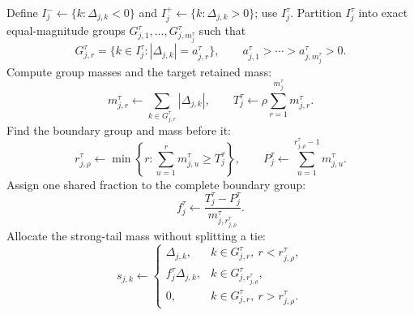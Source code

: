 \begin{algorithm}[H]
\begin{algorithmic}[1]
                    \State Define
                    $I_j^-\leftarrow\{k:\Delta_{j,k}<0\}$ and
                    $I_j^+\leftarrow\{k:\Delta_{j,k}>0\}$; use $I_j^\tau$.
                        \State Partition $I_j^\tau$ into exact equal-magnitude groups
                        $G_{j,1}^\tau,\dots,G_{j,m_j^\tau}^\tau$ such that
                        \[
                            G_{j,r}^\tau
                            =\{k\in I_j^\tau:|\Delta_{j,k}|=a_{j,r}^\tau\},
                            \qquad
                            a_{j,1}^\tau>\cdots>a_{j,m_j^\tau}^\tau>0.
                        \]
                        \State Compute group masses and the target retained mass:
                        \[
                            m_{j,r}^\tau\leftarrow
                            \sum_{k\in G_{j,r}^\tau}|\Delta_{j,k}|,
                            \qquad
                            T_j^\tau\leftarrow
                            \rho\sum_{r=1}^{m_j^\tau}m_{j,r}^\tau.
                        \]
                        \State Find the boundary group and mass before it:
                        \[
                            r_{j,\rho}^\tau\leftarrow
                            \min\left\{r:
                            \sum_{u=1}^{r}m_{j,u}^\tau\ge T_j^\tau\right\},
                            \qquad
                            P_j^\tau\leftarrow
                            \sum_{u=1}^{r_{j,\rho}^\tau-1}m_{j,u}^\tau.
                        \]
                        \State Assign one shared fraction to the complete boundary group:
                        \[
                            f_j^\tau\leftarrow
                            \frac{T_j^\tau-P_j^\tau}
                            {m_{j,r_{j,\rho}^\tau}^\tau}.
                        \]
                        \State Allocate the strong-tail mass without splitting a tie:
                        \[
                            s_{j,k}\leftarrow
                            \begin{cases}
                                \Delta_{j,k},
                                &k\in G_{j,r}^\tau,\ r<r_{j,\rho}^\tau,\\
                                f_j^\tau\Delta_{j,k},
                                &k\in G_{j,r_{j,\rho}^\tau}^\tau,\\
                                0,
                                &k\in G_{j,r}^\tau,\ r>r_{j,\rho}^\tau.
                            \end{cases}
                        \]
                    \EndIf
                \EndFor


\end{algorithmic}
\end{algorithm}
